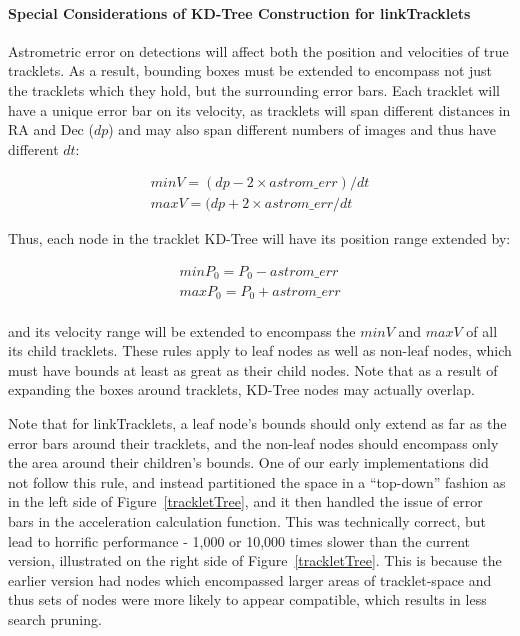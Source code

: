 \paragraph{Special Considerations of KD-Tree Construction for linkTracklets} 

Astrometric error on detections will affect both the position and
velocities of true tracklets.  As a result, bounding boxes must be
extended to encompass not just the tracklets which they hold, but the
surrounding error bars.  Each tracklet will have a unique error bar on
its velocity, as tracklets will span different distances in RA and Dec
($dp$) and may also span different numbers of images and thus have
different $dt$:

\begin{eqnarray}
minV = (dp - 2\times astrom\_err)/dt  \\
maxV = (dp + 2\times astrom\_err /dt
\end{eqnarray}

Thus, each node in the tracklet KD-Tree will have its position range extended by:

\begin{eqnarray}
minP_0 = P_0 - astrom\_err \\
maxP_0 = P_0 + astrom\_err  
\end{eqnarray}
\\ and its velocity range will be extended to encompass the $minV$ and
$maxV$ of all its child tracklets.  These rules apply to leaf nodes as
well as non-leaf nodes, which must have bounds at least as great as
their child nodes.  Note that as a result of expanding the boxes
around tracklets, KD-Tree nodes may actually overlap.

Note that for linkTracklets, a leaf node's bounds should only extend
as far as the error bars around their tracklets, and the non-leaf
nodes should encompass only the area around their children's bounds.
One of our early implementations did not follow this rule, and instead
partitioned the space in a ``top-down'' fashion as in the left side of
Figure~\ref{trackletTree}, and it then handled the issue of error bars
in the acceleration calculation function.  This was technically
correct, but lead to horrific performance - 1,000 or 10,000 times
slower than the current version, illustrated on the right side of
Figure~\ref{trackletTree}.  This is because the earlier version had
nodes which encompassed larger areas of tracklet-space and thus sets
of nodes were more likely to appear compatible, which results in less
search pruning.

